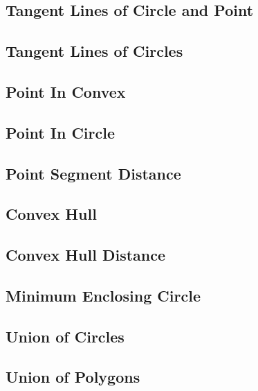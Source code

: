 \subsection{Tangent Lines of Circle and Point}

\subsection{Tangent Lines of Circles}

\subsection{Point In Convex}
\subsection{Point In Circle}

\subsection{Point Segment Distance}

\subsection{Convex Hull}

\subsection{Convex Hull Distance}

\subsection{Minimum Enclosing Circle}

\subsection{Union of Circles}
\subsection{Union of Polygons}
% 
% 
